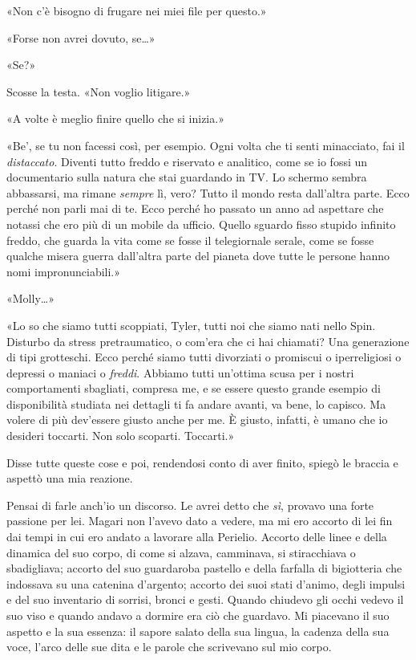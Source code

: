 «Non c'è bisogno di frugare nei miei file per questo.»

«Forse non avrei dovuto, se\ldots»

«Se?»

Scosse la testa. «Non voglio litigare.»

«A volte è meglio finire quello che si inizia.»

«Be', se tu non facessi così, per esempio. Ogni volta che ti senti
minacciato, fai il \emph{distaccato}. Diventi tutto freddo e riservato e
analitico, come se io fossi un documentario sulla natura che stai
guardando in TV. Lo schermo sembra abbassarsi, ma rimane \emph{sempre}
lì, vero? Tutto il mondo resta dall'altra parte. Ecco perché non parli
mai di te. Ecco perché ho passato un anno ad aspettare che notassi che
ero più di un mobile da ufficio. Quello sguardo fisso stupido infinito
freddo, che guarda la vita come se fosse il telegiornale serale, come se
fosse qualche misera guerra dall'altra parte del pianeta dove tutte le
persone hanno nomi impronunciabili.»

«Molly\ldots»

«Lo so che siamo tutti scoppiati, Tyler, tutti noi che siamo nati nello
Spin. Disturbo da stress pretraumatico, o com'era che ci hai chiamati?
Una generazione di tipi grotteschi. Ecco perché siamo tutti divorziati o
promiscui o iperreligiosi o depressi o maniaci o \emph{freddi}. Abbiamo
tutti un'ottima scusa per i nostri comportamenti sbagliati, compresa me,
e se essere questo grande esempio di disponibilità studiata nei dettagli
ti fa andare avanti, va bene, lo capisco. Ma volere di più dev'essere
giusto anche per me. È giusto, infatti, è umano che io desideri
toccarti. Non solo scoparti. Toccarti.»

Disse tutte queste cose e poi, rendendosi conto di aver finito, spiegò
le braccia e aspettò una mia reazione.

Pensai di farle anch'io un discorso. Le avrei detto che \emph{sì},
provavo una forte passione per lei. Magari non l'avevo dato a vedere, ma
mi ero accorto di lei fin dai tempi in cui ero andato a lavorare alla
Perielio. Accorto delle linee e della dinamica del suo corpo, di come si
alzava, camminava, si stiracchiava o sbadigliava; accorto del suo
guardaroba pastello e della farfalla di bigiotteria che indossava su una
catenina d'argento; accorto dei suoi stati d'animo, degli impulsi e del
suo inventario di sorrisi, bronci e gesti. Quando chiudevo gli occhi
vedevo il suo viso e quando andavo a dormire era ciò che guardavo. Mi
piacevano il suo aspetto e la sua essenza: il sapore salato della sua
lingua, la cadenza della sua voce, l'arco delle sue dita e le parole che
scrivevano sul mio corpo.

